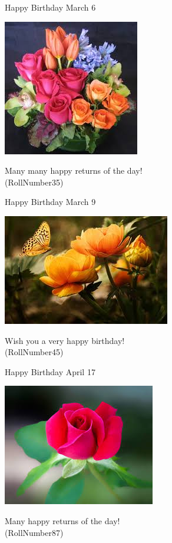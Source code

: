 \documentclass[table, landscape]{beamer}
\begin{document}
\begin{frame}{\color{blue}Happy Birthday }
{March 6}
\begin{center}
\includegraphics[height=0.5\textheight]{flowers/f9.jpeg}

Many many happy returns of the day! \\ \vspace{0.5cm}{\Large name30} (RollNumber35)
\end{center}
\end{frame}
\begin{frame}{\color{red}Happy Birthday }
{March 9}
\begin{center}
\includegraphics[height=0.5\textheight]{flowers/f7.jpeg}

Wish you a very happy birthday! \\ \vspace{0.5cm}{\Large name38} (RollNumber45)
\end{center}
\end{frame}
\begin{frame}{\color{red}Happy Birthday }
{April 17}
\begin{center}
\includegraphics[height=0.5\textheight]{flowers/f3.jpeg}

Many happy returns of the day! \\ \vspace{0.5cm}{\Large name80} (RollNumber87)
\end{center}
\end{frame}
\end{document}

